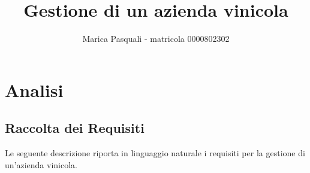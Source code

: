 \documentclass{article}
\title{Gestione di un azienda vinicola}\date{}
\author{Marica Pasquali - matricola 0000802302}
\begin{document}
\maketitle  

\newpage
\tableofcontents
\newpage
\section{Analisi}
\subsection{Raccolta dei Requisiti}
Le seguente descrizione riporta in linguaggio naturale i requisiti per la gestione di un'azienda vinicola.\\
\newline
\newline
\end{document}
